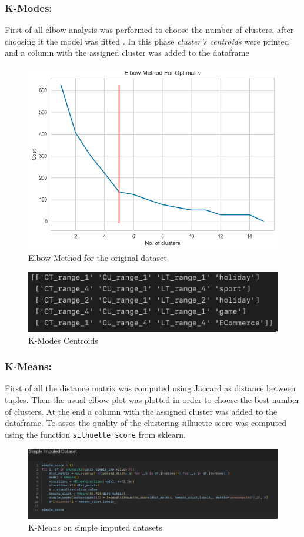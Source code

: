 \documentclass{article}
\begin{document}
\subsubsection{K-Modes:} First of all elbow analysis was performed to choose the number of clusters, after choosing it the model was fitted . In this phase \emph{cluster's centroids} were printed and a column with the assigned cluster was added to the dataframe
\begin{figure}[h]\centering
	\includegraphics[scale=0.4]{img/elbow.png}
	\caption{Elbow Method for the original dataset}
\end{figure}
\begin{figure}[h]\centering
	\includegraphics[scale=0.5]{img/centroids.png}
	\caption{K-Modes Centroids}
\end{figure}
			
\subsubsection{K-Means:} First of all the distance matrix was computed using Jaccard as distance between tuples. Then the usual elbow plot was plotted in order to choose the best number of clusters. At the end a column with the assigned cluster was added to the dataframe.  To asses the quality of the clustering silhuette score was computed using the function \texttt{silhuette\_score} from sklearn.
\begin{figure}[h]
	\includegraphics[width=\textwidth]{img/kmeans.png}
	\caption{K-Means on simple imputed datasets}
\end{figure}
\newpage
\end{document}
